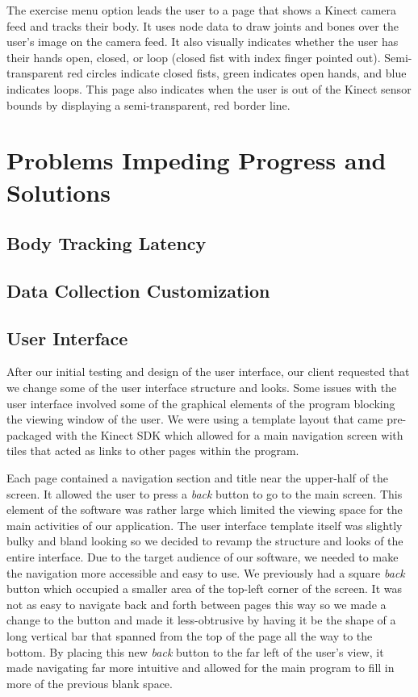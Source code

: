 \documentclass[onecolumn, draftclsnofoot,10pt, compsoc]{IEEEtran}
\begin{document}
The exercise menu option leads the user to a page that shows a Kinect camera feed and tracks their body. It uses node data to draw joints and bones over the user's image on the camera feed. It also visually indicates whether the user has their hands open, closed, or  loop (closed fist with index finger pointed out). Semi-transparent red circles indicate closed fists, green indicates open hands, and blue indicates loops. This page also indicates when the user is out of the Kinect sensor bounds by displaying a semi-transparent, red border line. 

\section{Problems Impeding Progress and Solutions}
\subsection{Body Tracking Latency}
\subsection{Data Collection Customization}
\subsection{User Interface}
After our initial testing and design of the user interface, our client requested that we change some of the user interface structure and looks. Some issues with the user interface involved some of the graphical elements of the program blocking the viewing window of the user. We were using a template layout that came pre-packaged with the Kinect SDK which allowed for a main navigation screen with tiles that acted as links to other pages within the program.

Each page contained a navigation section and title near the upper-half of the screen. It allowed the user to press a \textit{back} button to go to the main screen. This element of the software was rather large which limited the viewing space for the main activities of our application. The user interface template itself was slightly bulky and bland looking so we decided to revamp the structure and looks of the entire interface. Due to the target audience of our software, we needed to make the navigation more accessible and easy to use. We previously had a square \textit{back} button which occupied a smaller area of the top-left corner of the screen. It was not as easy to navigate back and forth between pages this way so we made a change to the button and made it less-obtrusive by having it be the shape of a long vertical bar that spanned from the top of the page all the way to the bottom. By placing this new \textit{back} button to the far left of the user's view, it made navigating far more intuitive and allowed for the main program to fill in more of the previous blank space.
\end{document}
